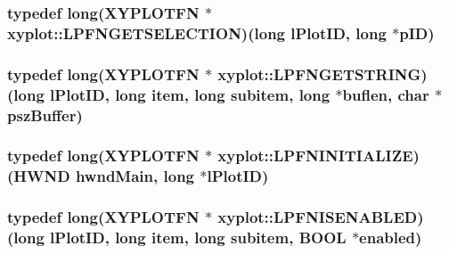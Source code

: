 \hypertarget{namespacexyplot_accdc65e18386127090607d48d4d6ef55}{
\subsubsection[{L\-P\-F\-N\-G\-E\-T\-S\-E\-L\-E\-C\-T\-I\-O\-N}]{\setlength{\rightskip}{0pt plus 5cm}typedef {\bf long}({\bf X\-Y\-P\-L\-O\-T\-F\-N} $\ast$ xyplot\-::\-L\-P\-F\-N\-G\-E\-T\-S\-E\-L\-E\-C\-T\-I\-O\-N)({\bf long} l\-Plot\-I\-D, {\bf long} $\ast$p\-I\-D)}}\label{namespacexyplot_accdc65e18386127090607d48d4d6ef55}
\hypertarget{namespacexyplot_ae11ea8cd7e895887b754555f31b0adf3}{
\subsubsection[{L\-P\-F\-N\-G\-E\-T\-S\-T\-R\-I\-N\-G}]{\setlength{\rightskip}{0pt plus 5cm}typedef {\bf long}({\bf X\-Y\-P\-L\-O\-T\-F\-N} $\ast$ xyplot\-::\-L\-P\-F\-N\-G\-E\-T\-S\-T\-R\-I\-N\-G)({\bf long} l\-Plot\-I\-D, {\bf long} item, {\bf long} subitem, {\bf long} $\ast$buflen, char $\ast$psz\-Buffer)}}\label{namespacexyplot_ae11ea8cd7e895887b754555f31b0adf3}
\hypertarget{namespacexyplot_a8c5635641ba2648c95a8b29c01393f78}{
\subsubsection[{L\-P\-F\-N\-I\-N\-I\-T\-I\-A\-L\-I\-Z\-E}]{\setlength{\rightskip}{0pt plus 5cm}typedef {\bf long}({\bf X\-Y\-P\-L\-O\-T\-F\-N} $\ast$ xyplot\-::\-L\-P\-F\-N\-I\-N\-I\-T\-I\-A\-L\-I\-Z\-E)(H\-W\-N\-D hwnd\-Main, {\bf long} $\ast$l\-Plot\-I\-D)}}\label{namespacexyplot_a8c5635641ba2648c95a8b29c01393f78}
\hypertarget{namespacexyplot_a2b24ec8edd78c631d7576e9e0804bd3b}{
\subsubsection[{L\-P\-F\-N\-I\-S\-E\-N\-A\-B\-L\-E\-D}]{\setlength{\rightskip}{0pt plus 5cm}typedef {\bf long}({\bf X\-Y\-P\-L\-O\-T\-F\-N} $\ast$ xyplot\-::\-L\-P\-F\-N\-I\-S\-E\-N\-A\-B\-L\-E\-D)({\bf long} l\-Plot\-I\-D, {\bf long} item, {\bf long} subitem, B\-O\-O\-L $\ast$enabled)}}\label{namespacexyplot_a2b24ec8edd78c631d7576e9e0804bd3b}
